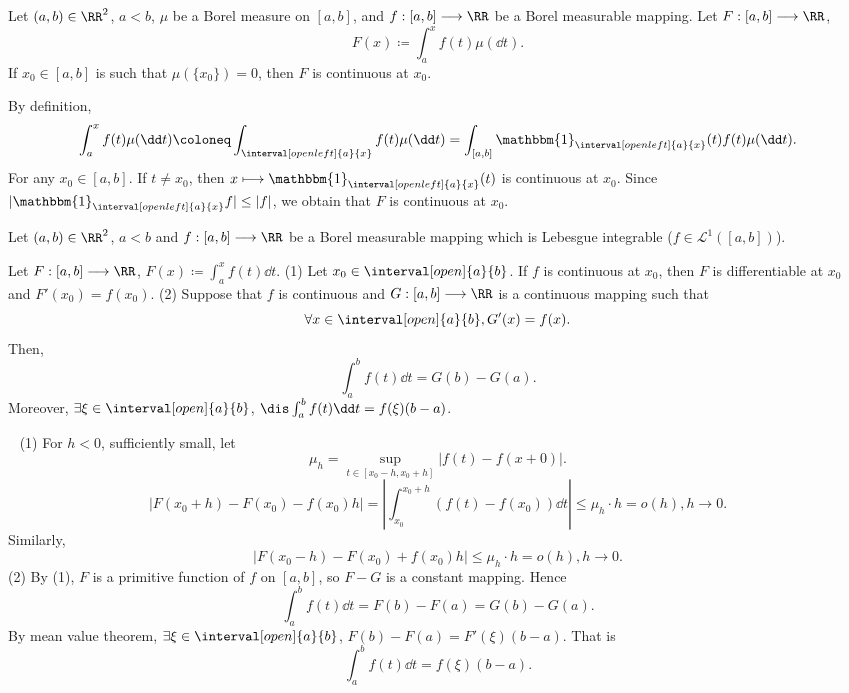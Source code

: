 \begin{corollaryenv}
    Let $(a,b)\in \RR^2$, $a<b$, $\mu$ be a Borel measure on $[a,b]$, and $f:[a,b]\longrightarrow \RR$ be a Borel measurable mapping. Let $F:[a,b]\longrightarrow \RR$,
    $$ F(x)\coloneq \int_{a}^{x} f(t) \mu(\dd t). $$
    If $x_0\in [a,b]$ is such that $\mu(\{x_0\})=0$, then $F$ is continuous at $x_0$.
\end{corollaryenv}
\begin{proofenv}
    By definition,
    $$ \int_{a}^{x} f(t)\mu(\dd t)\coloneq \int_{\interval[open left]{a}{x}} f(t)\mu(\dd t)=\int_{[a,b]}\mathbbm{1}_{\interval[open left]{a}{x}}(t)f(t)\mu(\dd t).$$
    For any $x_0\in [a,b]$. If $t\neq x_0$, then $x\longmapsto \mathbbm{1}_{\interval[open left]{a}{x}}(t)$ is continuous at $x_0$.
    Since $|\mathbbm{1}_{\interval[open left]{a}{x}}f|\le |f|$, we obtain that $F$ is continuous at $x_0$.
\end{proofenv}
\begin{theoremenv}
    Let $(a,b)\in \RR^2$, $a<b$ and $f:[a,b]\longrightarrow\RR$ be a Borel measurable mapping which is Lebesgue integrable ($f\in \mathcal{L}^1([a,b])$).

    Let $F:[a,b]\longrightarrow \RR$, $F(x)\coloneq \int_{a}^{x} f(t)\dd t$.
    \newline
    (1) Let $x_0\in \interval[open]{a}{b}$. If $f$ is continuous at $x_0$, then $F$ is differentiable at $x_0$ and $F'(x_0)=f(x_0)$.
    \newline
    (2) Suppose that $f$ is continuous and $G:[a,b]\longrightarrow \RR$ is a continuous mapping such that
    $$ \forall x\in \interval[open]{a}{b}, G'(x) =f (x).$$
    Then,
    $$ \int_{a}^{b} f(t)\dd t =G (b)-G(a).$$
    Moreover, $ \exists \xi\in \interval[open]{a}{b}$, $\dis \int_{a}^{b} f(t)\dd t=f(\xi)(b-a)$.
\end{theoremenv}
\begin{proofenv}
    \ \newline
    (1) For $h<0$, sufficiently small, let
    $$\mu_{h}=\sup_{t\in [x_0-h,x_0+h]}|f(t)-f(x+0)|.$$
    $$ |F(x_0+h)-F(x_0)-f(x_0)h|=\left| \int_{x_0}^{x_0+h} (f(t)-f(x_0)) \dd t\right|\le \mu_{h}\cdot h=o(h), h\rightarrow 0.$$
    Similarly,
    $$ |F(x_0-h)-F(x_0)+f(x_0)h|\le \mu_h\cdot h=o(h), h\rightarrow 0.$$
    (2) By (1), $F$ is a primitive function of $f$ on $[a,b]$, so $F-G$ is a constant mapping. Hence
    $$ \int_{a}^{b}f(t)\dd t=F(b)-F(a)=G(b)-G(a).$$
    By mean value theorem, $\exists \xi \in \interval[open]{a}{b}$, $F(b)-F(a)=F'(\xi )(b-a)$.
    That is 
    $$ \int_{a}^{b} f(t)\dd t=f(\xi)(b-a).$$
\end{proofenv}

